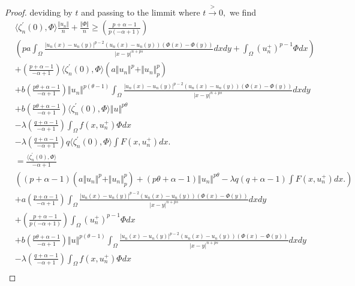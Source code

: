 \documentclass[10pt,twoside,reqno,centertags,draft]{amsart}
\begin{document}
\begin{proof}
deviding by $ t$ and passing to the limmit where $ t \xrightarrow{>} 0,$ we find
{\scriptsize
\begin{equation}
\begin{aligned}
& \langle\zeta^{\prime}_n(0),\Phi \rangle\frac{\Vert u_n\Vert}{n} +\frac{\Vert \Phi\Vert}{n} \geq \left(\frac{p +\alpha -1}{p(-\alpha +1)}\right)\\
&\left(p a\int_{\Omega}\frac{\vert u_n(x) -u_n(y)\vert^{p-2}(u_n(x) -u_n(y))(\Phi(x) -\Phi(y))}{\vert x -y\vert^{n  +ps}}dxdy +\int_{\Omega}(u_n^+)^{p -1}\Phi dx\right)\\
& +\left(\frac{p +\alpha -1}{-\alpha +1}\right)\langle \zeta^{\prime}_n(0),\Phi \rangle\left( a\Vert u_n\Vert^{p} +\Vert u_n\Vert^{p}_{p}\right)\\
& +b\left( \frac{p\theta +\alpha -1}{-\alpha +1}\right)\Vert u_n\Vert^{p(\theta -1)}\int_{\Omega}\frac{\vert u_n(x) -u_n(y)\vert^{p-2}( u_n(x) -u_n(y))(\Phi(x) -\Phi(y))}{\vert x -y\vert^{n  +ps}}dxdy\\
&+b\left( \frac{p\theta +\alpha -1}{-\alpha +1}\right)\langle \zeta^{\prime}_n(0),\Phi \rangle\Vert u\Vert^{p\theta }\\
& -\lambda\left(  \frac{q +\alpha -1}{-\alpha +1}\right)\int_{\Omega} f(x,u_n^+)\Phi dx\\
& -\lambda\left(  \frac{q +\alpha -1}{-\alpha +1}\right) q \langle \zeta^{\prime}_n(0),\Phi \rangle\int F(x,u_n^+)dx. \\
& =\frac{\langle \zeta^{\prime}_n(0),\Phi \rangle}{-\alpha +1}\\
&\left( (p +\alpha -1)\left( a\Vert u_n\Vert^{p} +\Vert u_n\Vert^{p}_{p}\right) +(p\theta +\alpha -1)\Vert u_n\Vert^{p\theta} -\lambda q(q +\alpha -1)\int F(x,u_n^+)dx.\right)\\
& +a\left(\frac{p +\alpha -1}{-\alpha +1}\right)\int_{\Omega}\frac{\vert u_n(x) -u_n(y)\vert^{p-2}(u_n(x) -u_n(y))(\Phi(x) -\Phi(y))}{\vert x -y\vert^{n  +ps}}dxdy
\\
& +\left(\frac{p +\alpha -1}{p(-\alpha +1)}\right)\int_{\Omega}(u_n^+)^{p -1}\Phi dx\\
& +b\left( \frac{p\theta +\alpha -1}{-\alpha +1}\right)\Vert u\Vert^{p(\theta -1)}\int_{\Omega}\frac{\vert u_n(x) -u_n(y)\vert^{p-2}(u_n(x) -u_n(y))(\Phi(x) -\Phi(y))}{\vert x -y\vert^{n  +ps}}dxdy\\
& -\lambda\left(  \frac{q +\alpha -1}{-\alpha +1}\right)\int_{\Omega} f(x,u_n^+)\Phi dx\\
\end{aligned}
\end{equation}
}
\end{proof}
\end{document}
